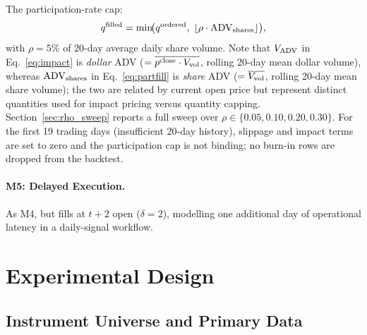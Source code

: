 \documentclass[12pt]{article}
\begin{document}
The participation-rate cap:
\begin{equation}
  q^{\rm filled} = \min\!\bigl(q^{\rm ordered},\;
    \lfloor \rho \cdot \mathrm{ADV}_{\rm shares} \rfloor\bigr),
  \label{eq:partfill}
\end{equation}
with $\rho = 5\%$ of 20-day average daily share volume.
Note that $V_{\rm ADV}$ in Eq.~\eqref{eq:impact} is \emph{dollar} ADV
($= \overline{p^{\rm close} \cdot V_{\rm vol}}$, rolling 20-day mean
dollar volume), whereas $\mathrm{ADV}_{\rm shares}$ in
Eq.~\eqref{eq:partfill} is \emph{share} ADV
($= \overline{V_{\rm vol}}$, rolling 20-day mean share volume);
the two are related by current open price but represent distinct
quantities used for impact pricing versus quantity capping.
Section~\ref{sec:rho_sweep} reports a full sweep over
$\rho \in \{0.05, 0.10, 0.20, 0.30\}$.
For the first 19 trading days (insufficient 20-day history),
slippage and impact terms are set to zero and the participation cap is
not binding; no burn-in rows are dropped from the backtest.

\paragraph{M5: Delayed Execution.}
As M4, but fills at $t{+}2$ open ($\delta = 2$), modelling one
additional day of operational latency in a daily-signal workflow.


\section{Experimental Design}
\label{sec:setup}

\subsection{Instrument Universe and Primary Data}
\end{document}
